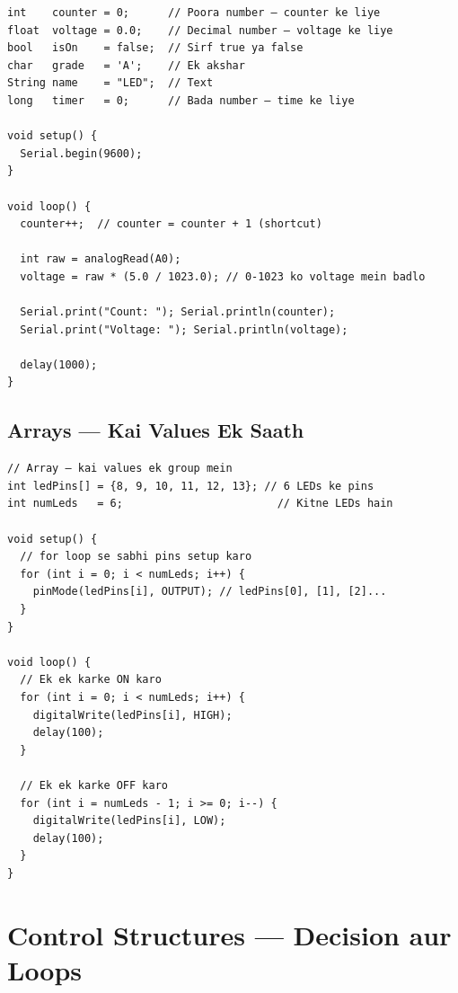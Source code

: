 \documentclass[12pt,a4paper]{article}
\begin{document}
\begin{tcolorbox}[codebox=Example 9: Variables ka Use]
\begin{lstlisting}
int    counter = 0;      // Poora number — counter ke liye
float  voltage = 0.0;    // Decimal number — voltage ke liye
bool   isOn    = false;  // Sirf true ya false
char   grade   = 'A';    // Ek akshar
String name    = "LED";  // Text
long   timer   = 0;      // Bada number — time ke liye

void setup() {
  Serial.begin(9600);
}

void loop() {
  counter++;  // counter = counter + 1 (shortcut)

  int raw = analogRead(A0);
  voltage = raw * (5.0 / 1023.0); // 0-1023 ko voltage mein badlo

  Serial.print("Count: "); Serial.println(counter);
  Serial.print("Voltage: "); Serial.println(voltage);

  delay(1000);
}
\end{lstlisting}
\end{tcolorbox}

\subsection{Arrays — Kai Values Ek Saath}

\begin{tcolorbox}[codebox=Example 10: Array se Multiple LEDs Control]
\begin{lstlisting}
// Array — kai values ek group mein
int ledPins[] = {8, 9, 10, 11, 12, 13}; // 6 LEDs ke pins
int numLeds   = 6;                        // Kitne LEDs hain

void setup() {
  // for loop se sabhi pins setup karo
  for (int i = 0; i < numLeds; i++) {
    pinMode(ledPins[i], OUTPUT); // ledPins[0], [1], [2]...
  }
}

void loop() {
  // Ek ek karke ON karo
  for (int i = 0; i < numLeds; i++) {
    digitalWrite(ledPins[i], HIGH);
    delay(100);
  }

  // Ek ek karke OFF karo
  for (int i = numLeds - 1; i >= 0; i--) {
    digitalWrite(ledPins[i], LOW);
    delay(100);
  }
}
\end{lstlisting}
\end{tcolorbox}

\newpage

\section{Control Structures — Decision aur Loops}
\end{document}
